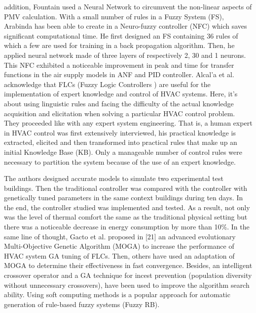 addition, Fountain used a Neural Network to circumvent the non-linear aspects of PMV calculation.   With a small number of rules in a Fuzzy System (FS), Arabinda has been able to create in \cite{invertedpendulum} a Neuro-fuzzy controller (NFC) which saves significant computational time. He first designed an FS containing 36 rules of which a few are used for training in a back propagation algorithm. Then, he applied neural network made of three layers of respectively 2, 30 and 1 neurons. This NFC exhibited a noticeable improvement in peak and time for transfer functions in the air supply models in ANF and PID controller. Alcal’a et al. acknowledge that FLCs (Fuzzy Logic Controllers ) are useful for the implementation of expert knowledge and control of HVAC systems. Here, it’s about using linguistic rules and facing the difficulty of the actual knowledge acquisition and elicitation when solving a particular HVAC control problem. They proceeded like with any expert system engineering. That is, a human expert in HVAC control was first extensively interviewed, his practical knowledge is extracted, elicited and then transformed into practical rules that make up an initial Knowledge Base (KB). Only a manageable number of control rules were necessary to partition the system because of the use of an expert knowledge.

The authors designed accurate models to simulate two experimental test buildings. Then the traditional controller was compared with the controller with genetically tuned parameters in the same context buildings during ten days. In the end, the controller studied was implemented and tested. As a result, not only was the level of thermal comfort the same as the traditional physical setting but there was a noticeable decrease in energy consumption by more than 10\%. In the same line of thought, Gacto et al. proposed in [21] an advanced evolutionary Multi-Objective Genetic Algorithm (MOGA) to increase the performance of HVAC system GA tuning of FLCs. Then, others have used an adaptation of MOGA to determine their effectiveness in fast convergence. Besides, an intelligent crossover operator and a GA technique for incest prevention (population diversity without unnecessary crossovers), have been used to improve the algorithm search ability. Using soft computing methods is a popular approach for automatic generation of rule-based fuzzy systems (Fuzzy RB).

